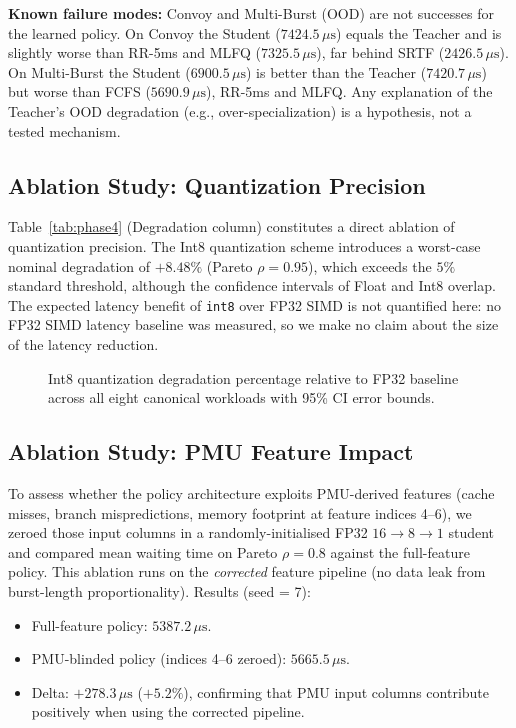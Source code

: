 \textbf{Known failure modes:} Convoy and Multi-Burst (OOD) are not successes
for the learned policy. On Convoy the Student ($7424.5\,\mu\text{s}$) equals the
Teacher and is slightly worse than RR-5ms and MLFQ ($7325.5\,\mu\text{s}$),
far behind SRTF ($2426.5\,\mu\text{s}$). On Multi-Burst the Student
($6900.5\,\mu\text{s}$) is better than the Teacher ($7420.7\,\mu\text{s}$) but
worse than FCFS ($5690.9\,\mu\text{s}$), RR-5ms and MLFQ. Any explanation of the
Teacher's OOD degradation (e.g., over-specialization) is a hypothesis, not a
tested mechanism.

\subsection{Ablation Study: Quantization Precision}
\label{subsec:ablation_quant}

Table~\ref{tab:phase4} (Degradation column) constitutes a direct ablation of
quantization precision. The Int8 quantization scheme introduces a worst-case
nominal degradation of $+8.48\%$ (Pareto $\rho = 0.95$), which exceeds the
$5\%$ standard threshold, although the confidence intervals of Float and Int8
overlap. The expected latency benefit of \texttt{int8} over FP32 SIMD is not
quantified here: no FP32 SIMD latency baseline was measured, so we make no
claim about the size of the latency reduction.

\begin{figure}[t]
  \centering
  \caption{Int8 quantization degradation percentage relative to FP32 baseline across all eight canonical workloads with 95\% CI error bounds.}
  \label{fig:quant_degradation}
\end{figure}

\subsection{Ablation Study: PMU Feature Impact}
\label{subsec:ablation_pmu}

To assess whether the policy architecture exploits PMU-derived features
(cache misses, branch mispredictions, memory footprint at feature indices 4--6),
we zeroed those input columns in a randomly-initialised FP32 $16\to 8\to 1$
student and compared mean waiting time on Pareto $\rho=0.8$ against the
full-feature policy. This ablation runs on the \emph{corrected} feature pipeline
(no data leak from burst-length proportionality). Results (seed = 7):
\begin{itemize}
  \item Full-feature policy: $5387.2\,\mu\text{s}$.
  \item PMU-blinded policy (indices 4--6 zeroed): $5665.5\,\mu\text{s}$.
  \item Delta: $+278.3\,\mu\text{s}$ ($+5.2\%$), confirming that PMU input
    columns contribute positively when using the corrected pipeline.
\end{itemize}

